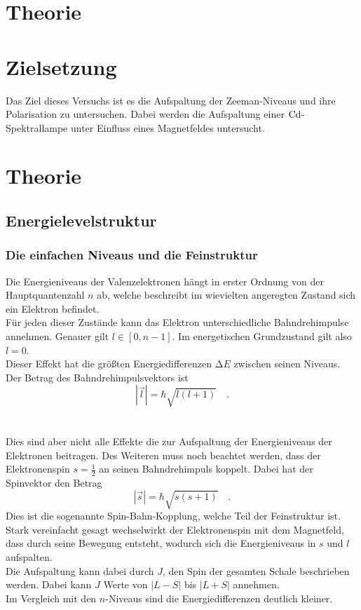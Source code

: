 \section{Theorie}

\section{Zielsetzung}
    Das Ziel dieses Versuchs ist es die Aufspaltung der Zeeman-Niveaus und ihre Polarisation zu untersuchen.
    Dabei werden die Aufspaltung einer $\ce{Cd}$-Spektrallampe unter Einfluss eines Magnetfeldes untersucht.
\section{Theorie}

\subsection{Energielevelstruktur}


\subsubsection{Die einfachen Niveaus und die Feinstruktur}

\noindent
Die Energieniveaus der Valenzelektronen hängt in erster Ordnung von der Hauptquantenzahl $n$ ab, 
welche beschreibt im wievielten angeregten Zustand sich ein Elektron befindet.\\
Für jeden dieser Zustände kann das Elektron unterschiedliche Bahndrehimpulse annehmen. Genauer gilt $l \in [0, n-1]$. Im energetischen Grundzustand gilt also $l = 0$.\\
Dieser Effekt hat die größten Energiedifferenzen $\increment E$ zwischen seinen Niveaus.
Der Betrag des Bahndrehimpulsvektors ist
\begin{equation*}
    |\vec{l}| = \hbar \sqrt{l(l+1)} \quad .
\end{equation*}\\\\
Dies sind aber nicht alle Effekte die zur Aufspaltung der Energieniveaus der Elektronen beitragen.
Des Weiteren muss noch beachtet werden, dass der Elektronenspin $s =\frac{1}{2}$ an seinen Bahndrehimpuls koppelt.
Dabei hat der Spinvektor den Betrag 
\begin{equation*}
    |\vec{s}| = \hbar \sqrt{s(s+1)} \quad .
\end{equation*}
Dies ist die sogenannte Spin-Bahn-Kopplung, welche Teil der Feinstruktur ist. \\
Stark vereinfacht gesagt wechselwirkt der Elektronenspin mit dem Magnetfeld, dass durch seine Bewegung entsteht, wodurch sich die Energieniveaus in $s$ und $l$ aufspalten.\\
Die Aufspaltung kann dabei durch $J$, den Spin der gesamten Schale beschrieben werden. Dabei kann $J$ Werte von $\bigl| L - S \bigr|$ bis $\bigl| L + S \bigr|$ annehmen.\\
Im Vergleich mit den $n$-Niveaus sind die Energiedifferenzen deutlich kleiner.\\\\

